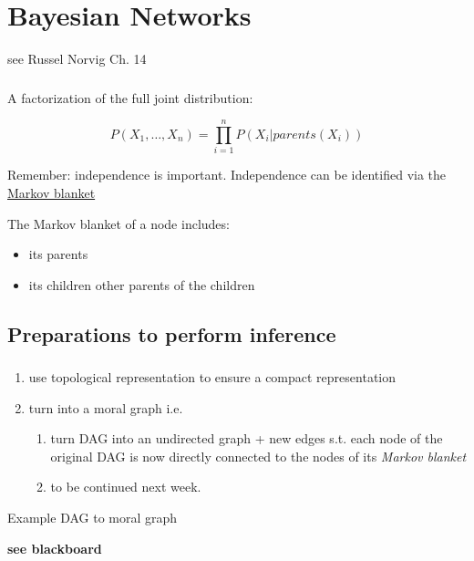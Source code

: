 \section{Bayesian Networks}

see Russel Norvig Ch. 14


\begin{frame}\frametitle{\secname}
    
A factorization of the full joint distribution:

\begin{equation}
P(X_{1},\ldots,X_{n}) = \prod_{i=1}^{n} P(X_{i} | parents(X_{i}))
\end{equation}
    
Remember: independence is important. Independence can be identified via the 
\underline{Markov blanket}

The Markov blanket of a node includes:
\begin{itemize}
\item its parents
\item its children
other parents of the children    
\end{itemize}
    
\end{frame}

\subsection{Preparations to perform inference}

\begin{frame}\frametitle{\subsecname}
    
    \begin{enumerate}
     \item use topological representation to ensure a compact representation
     \item turn into a moral graph i.e.
     \begin{enumerate}
     \item turn DAG into an undirected graph + new edges s.t. each node of the original DAG is now directly connected to the nodes of its \emph{Markov blanket}
     \item to be continued next week.
     \end{enumerate}   
    \end{enumerate}
    
\end{frame}

\begin{frame}

Example DAG to moral graph

\textbf{see blackboard}
    
\end{frame}
